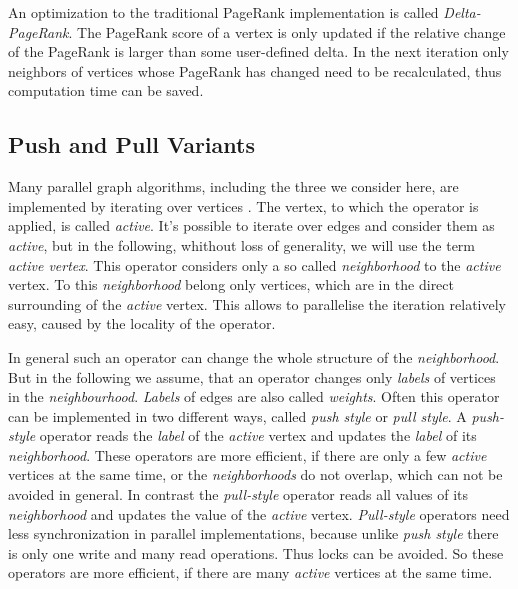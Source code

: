 An optimization to the traditional PageRank implementation is called \emph{Delta-PageRank}.
The PageRank score of a vertex is only updated if the relative change of the PageRank is larger than some user-defined delta.
In the next iteration only neighbors of vertices whose PageRank has changed need to be recalculated, thus computation time can be saved.

\subsection{Push and Pull Variants}
Many parallel graph algorithms, including the three we consider here, are implemented by iterating over vertices \cite{tao}.
The vertex, to which the operator is applied, is called \emph{active}.
It's possible to iterate over edges and consider them as \emph{active}, but in the following, whithout loss of generality, we will use the term \emph{active vertex}.
This operator considers only a so called \emph{neighborhood} to the \emph{active} vertex.
To this \emph{neighborhood} belong only vertices, which are in the direct surrounding of the \emph{active} vertex.
This allows to parallelise the iteration relatively easy, caused by the locality of the operator.

In general such an operator can change the whole structure of the \emph{neighborhood}.
But in the following we assume, that an operator changes only \emph{labels} of vertices in the \emph{neighbourhood}.
\emph{Labels} of edges are also called \emph{weights}.
Often this operator can be implemented in two different ways, called \emph{push style} or \emph{pull style}.
A \emph{push-style} operator reads the \emph{label} of the \emph{active} vertex and updates the \emph{label} of its \emph{neighborhood}.
These operators are more efficient, if there are only a few \emph{active} vertices at the same time, or the \emph{neighborhoods} do not overlap, which can not be avoided in general.
In contrast the \emph{pull-style} operator reads all values of its \emph{neighborhood} and updates the value of the \emph{active} vertex.
\emph{Pull-style} operators need less synchronization in parallel implementations, because unlike \emph{push style} there is only one write and many read operations.
Thus locks can be avoided.
So these operators are more efficient, if there are many \emph{active} vertices at the same time.

